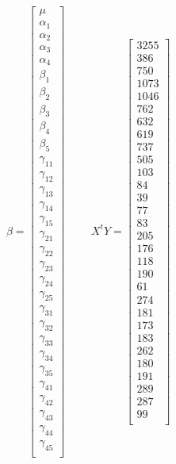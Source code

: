 \documentclass[10pt,a4paper]{report}
\begin{document}
\begin{enumerate}
    $\beta=\begin{bmatrix}
\mu \\
\alpha_{1}\\
\alpha_{2}\\
\alpha_{3}\\
\alpha_{4}\\
\beta_{1}\\
\beta_{2}\\
\beta_{3}\\
\beta_{4}\\
\beta_{5}\\
\gamma_{11}\\
\gamma_{12}\\
\gamma_{13}\\
\gamma_{14}\\
\gamma_{15}\\
\gamma_{21}\\
\gamma_{22}\\
\gamma_{23}\\
\gamma_{24}\\
\gamma_{25}\\
\gamma_{31}\\
\gamma_{32}\\
\gamma_{33}\\
\gamma_{34}\\
\gamma_{35}\\
\gamma_{41}\\
\gamma_{42}\\
\gamma_{43}\\
\gamma_{44}\\
\gamma_{45}\\
\end{bmatrix}\qquad$  
$X^{t}Y=\begin{bmatrix}
3255\\
386\\
750\\
1073\\
1046\\
762\\
632\\
619\\
737\\
505\\
103\\
84\\
39\\
77\\
83\\
205\\
176\\
118\\
190\\
61\\
274\\
181\\
173\\
183\\
262\\
180\\
191\\
289\\
287\\
99\\
\end{bmatrix}$




\end{enumerate}
\end{document}

